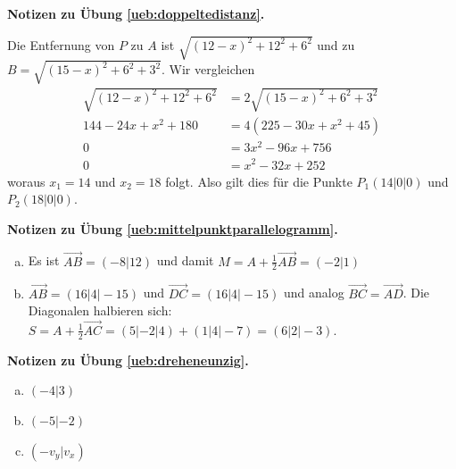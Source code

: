 \documentclass[%
11pt,%
twoside,%
titlepage,%
german,%
headsepline%
]{scrartcl}
\theoremstyle{definition}
\theoremstyle{plain}
\newcommand{\concatueb}[1]{ueb:#1}%
\newcommand{\concatlsg}[1]{lsg:#1}%
\newenvironment{lsg}[1]{%
    \par\noindent\textbf{Notizen zu Übung \ref{\concatueb{#1}}.}%
    \label{\concatlsg{#1}}
}{%
    \par%
}
\begin{document}
\begin{lsg}{doppeltedistanz}
    Die Entfernung von $P$ zu $A$ ist $\sqrt{(12-x)^2+12^2+6^2}$ und zu $B=\sqrt{(15-x)^2+6^2+3^2}$. Wir vergleichen
    \begin{align*}
        \sqrt{(12-x)^2+12^2+6^2} &= 2\sqrt{(15-x)^2+6^2+3^2}\\
        144-24x+x^2+180 &= 4(225-30x+x^2+45)\\
        0 &= 3x^2-96x+756\\
        0 &= x^2-32x+252
    \end{align*}
    woraus $x_1=14$ und $x_2=18$ folgt. Also gilt dies für die Punkte $P_1(14|0|0)$ und $P_2(18|0|0)$.
\end{lsg}
\begin{lsg}{mittelpunktparallelogramm}
    \begin{enumerate}[a)]
        \item Es ist $\vec{AB}=(-8|12)$ und damit $M=A+\frac{1}{2}\vec{AB}=(-2|1)$
        \item $\vec{AB}=(16|4|-15)$ und $\vec{DC}=(16|4|-15)$ und analog $\vec{BC}=\vec{AD}$.
        Die Diagonalen halbieren sich: $S=A+\frac{1}{2}\vec{AC}=(5|-2|4)+(1|4|-7)=(6|2|-3)$.
    \end{enumerate}
\end{lsg}
\begin{lsg}{dreheneunzig}
    \begin{enumerate}[a)]
        \item $(-4|3)$
        \item $(-5|-2)$
        \item $(-v_y|v_x)$
    \end{enumerate}
\end{lsg}
\end{document}
